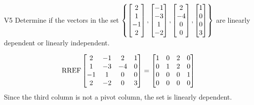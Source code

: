 \begin{problem}{V5}
Determine if the vectors in the set \(\left\{ \begin{bmatrix} 2 \\ 1 \\ -1 \\ 2 \end{bmatrix}, \begin{bmatrix} -1 \\ -3 \\ 1 \\ -2 \end{bmatrix}, \begin{bmatrix} 2 \\ -4 \\ 0 \\ 0 \end{bmatrix}, \begin{bmatrix} 1 \\ 0 \\ 0 \\ 3 \end{bmatrix} \right\} \) are linearly dependent or linearly independent.
\end{problem}
\begin{solution}
\[ \operatorname{RREF} \begin{bmatrix} 2 & -1 & 2  & 1\\ 1 & -3 & -4 & 0 \\ -1 & 1 & 0 & 0 \\ 2 & -2 & 0 & 3\end{bmatrix} = \begin{bmatrix} 1 & 0 & 2  & 0 \\ 0 & 1 & 2  & 0 \\ 0 & 0 & 0 & 1\\ 0 & 0 & 0 & 0 \end{bmatrix} \]
Since the third column is not a pivot column, the set is linearly dependent.
\end{solution}
